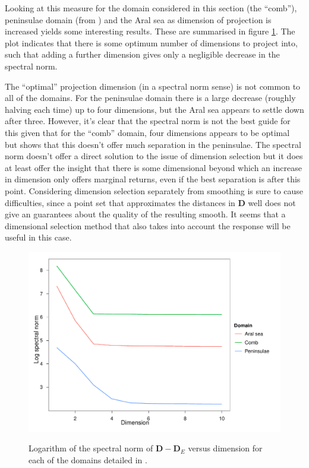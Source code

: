 Looking at this measure for the domain considered in this section (the ``comb''), peninsulae domain (from ) and the Aral sea as dimension of projection is increased yields some interesting results. These are summarised in figure \ref{increasek}. The plot indicates that there is some optimum number of dimensions to project into, such that adding a further dimension gives only a negligible decrease in the spectral norm. 

The ``optimal'' projection dimension (in a spectral norm sense) is not common to all of the domains. For the peninsulae domain there is a large decrease (roughly halving each time) up to four dimensions, but the Aral sea appears to settle down after three. However, it's clear that the spectral norm is not the best guide for this given that for the ``comb'' domain, four dimensions appears to be optimal but  shows that this doesn't offer much separation in the peninsulae. The spectral norm doesn't offer a direct solution to the issue of dimension selection but it does at least offer the insight that there is some dimensional beyond which an increase in dimension only offers marginal returns, even if the best separation is after this point. Considering dimension selection separately from smoothing is sure to cause difficulties, since a point set that approximates the distances in $\mathbf{D}$ well does not give an guarantees about the quality of the resulting smooth. It seems that a dimensional selection method that also takes into account the response will be useful in this case.

\begin{figure}
\includegraphics[width=\textwidth]{mds/figs/eigenplot.pdf} \\
\caption{Logarithm of the spectral norm of $\mathbf{D}-\mathbf{D}_E$ versus dimension for each of the domains detailed in .}
\label{increasek}
\end{figure}

